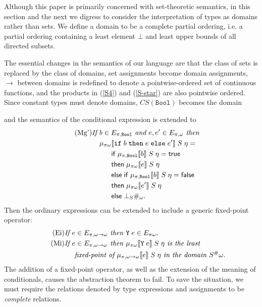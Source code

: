 \documentclass[sigplan,screen,nonacm,balance=false]{acmart}
\makeatletter
\theoremstyle{plain}
\DeclarePairedDelimiter{\interp}{\llbracket}{\rrbracket}
\newcommand{\ie}{i.e.\@\xspace}
\newcommand{\Bool}{\mathtt{Bool}}
\newcommand{\ifte}[3]{\mathtt{if} \; #1 \; \mathtt{then} \; #2 \; \mathtt{else} \; #3}
\newcommand{\Y}{\mathtt{Y}}
\newcommand{\true}{\mathsf{true}}
\newcommand{\false}{\mathsf{false}}
\newcommand{\ifm}{\mathsf{if}}
\newcommand{\thenm}{\mathsf{then}}
\newcommand{\elsem}{\mathsf{else}}
\newcommand{\CS}{\mathit{CS}}
\makeatother
\begin{document}
Although this paper is primarily concerned with set-theoretic semantics, in this section and the next we digress to consider the interpretation of types as domains rather than sets.
We define a domain to be a complete partial ordering, \ie a partial ordering containing a least element $\bot$ and least upper bounds of all directed subsets.

The essential changes in the semantics of our language are that the class of sets is replaced by the class of domains, set assignments become domain assignments, $\to$ between domains is redefined to denote a pointwise-ordered set of continuous functions, and the products in (\ref{S4}) and (\ref{S-star}) are also pointwise ordered.
Since constant types must denote domains, $\CS(\Bool)$ becomes the domain

\begin{center}
\end{center}

and the semantics of the conditional expression is extended to
%
\begin{align*}\tag{Mg'}
  \textit{If } & b \in E_{\pi, \Bool} \textit{ and } e, e' \in E_{\pi, \omega} \textit{ then } \\
  & \mu_{\pi \omega} \interp{\ifte{b}{e}{e'}} \; S \; \eta = \\
  & \phantom{\mu_{\pi \omega}} \ifm \; \mu_{\pi, \Bool} \interp{b} \; S \; \eta = \true \\
  & \phantom{\mu_{\pi \omega}} \thenm \; \mu_{\pi \omega} \interp{e} \; S \; \eta \\
  & \phantom{\mu_{\pi \omega}} \elsem \; \ifm \; \mu_{\pi, \Bool} \interp{b} \; S \; \eta = \false \\
  & \phantom{\mu_{\pi \omega}} \thenm \; \mu_{\pi \omega} \interp{e'} \; S \; \eta \\
  & \phantom{\mu_{\pi \omega}} \elsem \; \bot_S \#_\omega.
\end{align*}
%
Then the ordinary expressions can be extended to include a generic fixed-point operator:
%
\begin{align*}
  \tag{Ei}
  \textit{If } & e \in E_{\pi, \omega \to \omega} \textit{ then } \Y \; e \in E_{\pi \omega}, \\
  \tag{Mi}
  \textit{If } & e \in E_{\pi, \omega \to \omega} \textit{ then } \mu_{\pi \omega} \interp{\Y \; e} \; S \; \eta \textit{ is the least }\\
  & \textit{ fixed-point of } \mu_{\pi, \omega \to \omega} \interp{e} \; S \; \eta \textit{ in the domain } S^\# \omega.
\end{align*}
%
The addition of a fixed-point operator, as well as the extension of the meaning of conditionals, causes the abstraction theorem to fail.
To save the situation, we must require the relations denoted by type expressions and assignments to be \emph{complete} relations.
\end{document}
